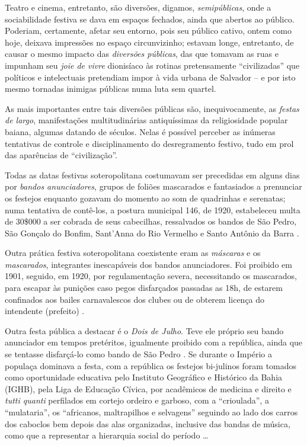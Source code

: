 

Teatro e cinema, entretanto, são diversões, digamos, \textit{semipúblicas}, onde a sociabilidade festiva se dava em espaços fechados, ainda que abertos ao público. Poderiam, certamente, afetar seu entorno, pois seu público cativo, ontem como hoje, deixava impressões no espaço circunvizinho; estavam longe, entretanto, de causar o mesmo impacto das \textit{diversões públicas}, das que tomavam as ruas e impunham seu \textit{joie de vivre} dionisíaco às rotinas pretensamente ``civilizadas'' que políticos e intelectuais pretendiam impor à vida urbana de Salvador -- e por isto mesmo tornadas inimigas públicas numa luta sem quartel.

As mais importantes entre tais diversões públicas são, inequivocamente, as \textit{festas de largo}, manifestações multitudinárias antiquíssimas da religiosidade popular baiana, algumas datando de séculos. Nelas é possível perceber as inúmeras tentativas de controle e disciplinamento do desregramento festivo, tudo em prol das aparências de ``civilização''.

Todas as datas festivas soteropolitana costumavam ser precedidas em alguns dias por \textit{bandos anunciadores}, grupos de foliões mascarados e fantasiados a prenunciar os festejos enquanto gozavam do momento ao som de quadrinhas e serenatas; numa tentativa de contê-los, a postura municipal 146, de 1920, estabeleceu multa de 30\$000 a ser cobrada de seus cabecilhas, ressalvados os bandos de São Pedro, São Gonçalo do Bonfim, Sant’Anna do Rio Vermelho e Santo Antônio da Barra \cite[pp.~42-43]{albuquerque_doisdejulho_1997}. 

Outra prática festiva soteropolitana coexistente eram as \textit{máscaras} e os \textit{mascarados}, integrantes inescapáveis dos bandos anunciadores. Foi proibido em 1901, seguido, em 1920, por regulamentação severa, necessitando os mascarados, para escapar às punições caso pegos disfarçados passadas as 18h, de estarem confinados aos bailes carnavalescos dos clubes ou de obterem licença do intendente (prefeito) \cite[p.~44]{albuquerque_doisdejulho_1997}. 

Outra festa pública a destacar é o \textit{Dois de Julho}. Teve ele próprio seu bando anunciador em tempos pretéritos, igualmente proibido com a república, ainda que se tentasse disfarçá-lo como bando de São Pedro \cite[p.~43]{albuquerque_doisdejulho_1997}. Se durante o Império a populaça dominava a festa, com a república os festejos bi-julinos foram tomados como oportunidade educativa pelo Instituto Geográfico e Histórico da Bahia (IGHB), pela Liga de Educação Cívica, por acadêmicos de medicina e direito e \textit{tutti quanti} perfilados em cortejo ordeiro e garboso, com a ``crioulada'', a ``mulataria'', os ``africanos, maltrapilhos e selvagens'' seguindo ao lado dos carros dos caboclos bem depois das alas organizadas, inclusive das bandas de música, como que a representar a hierarquia social do período \cite[p.~49]{albuquerque_doisdejulho_1997} \dots

